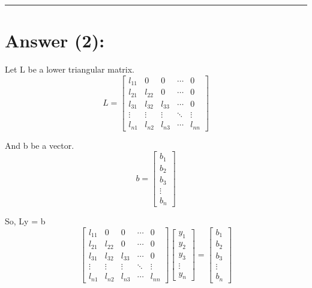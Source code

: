 \documentclass[11pt]{article}
\begin{document}
    \begin{center}\rule{0.5\linewidth}{0.5pt}\end{center}

    \hypertarget{answer-2}{%
\section{Answer (2):}\label{answer-2}}

    Let L be a lower triangular matrix. \[L = \begin{bmatrix}
    l_{11} & 0 & 0 & \cdots & 0 \\
    l_{21} & l_{22} & 0 & \cdots & 0 \\
    l_{31} & l_{32} & l_{33} & \cdots & 0 \\
    \vdots & \vdots & \vdots & \ddots & \vdots \\
    l_{n1} & l_{n2} & l_{n3} & \cdots & l_{nn}
\end{bmatrix}\]

    And b be a vector. \[b = \begin{bmatrix}
    b_{1}\\
    b_{2}\\
    b_{3}\\
    \vdots\\
    b_{n}
\end{bmatrix}\]

    So, Ly = b \[\begin{bmatrix}
    l_{11} & 0 & 0 & \cdots & 0 \\
    l_{21} & l_{22} & 0 & \cdots & 0 \\
    l_{31} & l_{32} & l_{33} & \cdots & 0 \\
    \vdots & \vdots & \vdots & \ddots & \vdots \\
    l_{n1} & l_{n2} & l_{n3} & \cdots & l_{nn}
\end{bmatrix} \begin{bmatrix}
    y_{1}\\
    y_{2}\\
    y_{3}\\
    \vdots\\
    y_{n}
\end{bmatrix} = \begin{bmatrix}
    b_{1}\\
    b_{2}\\
    b_{3}\\
    \vdots\\
    b_{n}
\end{bmatrix}\]
\end{document}
